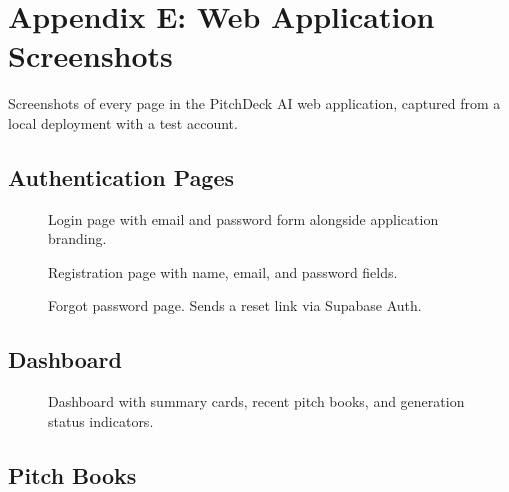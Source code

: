 \newpage

\section*{Appendix E: Web Application Screenshots}

Screenshots of every page in the PitchDeck AI web application, captured from a local deployment with a test account.

\subsection*{Authentication Pages}

\begin{figure}[H]
\centering
{}
\caption{Login page with email and password form alongside application branding.}
\label{fig:app-login}
\end{figure}

\begin{figure}[H]
\centering
{}
\caption{Registration page with name, email, and password fields.}
\label{fig:app-register}
\end{figure}

\begin{figure}[H]
\centering
{}
\caption{Forgot password page. Sends a reset link via Supabase Auth.}
\label{fig:app-forgot-password}
\end{figure}

\newpage

\subsection*{Dashboard}

\begin{figure}[H]
\centering
{}
\caption{Dashboard with summary cards, recent pitch books, and generation status indicators.}
\label{fig:app-dashboard}
\end{figure}

\newpage

\subsection*{Pitch Books}

